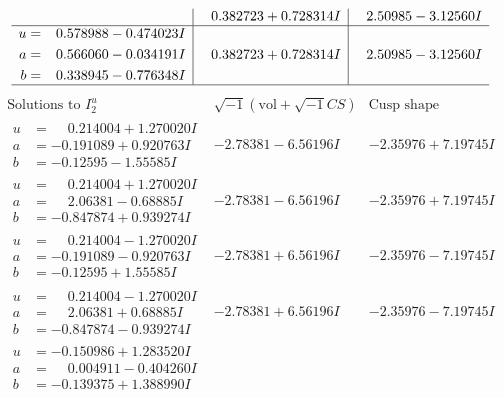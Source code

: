 \documentclass[1p]{elsarticle_modified}
\theoremstyle{definition}
\newcommand{\I}{\sqrt{-1}}
\begin{document}
$$\begin{array}{c|c|c}
 & \phantom{-}0.382723 + 0.728314 I & \phantom{-}2.50985 - 3.12560 I \\ \hline\begin{aligned}
u &= \phantom{-}0.578988 - 0.474023 I \\
a &= \phantom{-}0.566060 - 0.034191 I \\
b &= \phantom{-}0.338945 - 0.776348 I\end{aligned}
 & \phantom{-}0.382723 + 0.728314 I & \phantom{-}2.50985 - 3.12560 I\\
 \hline 
 \end{array}$$\newpage$$\begin{array}{c|c|c}  
\text{Solutions to }I^u_{2}& \I (\text{vol} + \sqrt{-1}CS) & \text{Cusp shape}\\
 \hline 
\begin{aligned}
u &= \phantom{-}0.214004 + 1.270020 I \\
a &= -0.191089 + 0.920763 I \\
b &= -0.12595 - 1.55585 I\end{aligned}
 & -2.78381 - 6.56196 I & -2.35976 + 7.19745 I \\ \hline\begin{aligned}
u &= \phantom{-}0.214004 + 1.270020 I \\
a &= \phantom{-}2.06381 - 0.68885 I \\
b &= -0.847874 + 0.939274 I\end{aligned}
 & -2.78381 - 6.56196 I & -2.35976 + 7.19745 I \\ \hline\begin{aligned}
u &= \phantom{-}0.214004 - 1.270020 I \\
a &= -0.191089 - 0.920763 I \\
b &= -0.12595 + 1.55585 I\end{aligned}
 & -2.78381 + 6.56196 I & -2.35976 - 7.19745 I \\ \hline\begin{aligned}
u &= \phantom{-}0.214004 - 1.270020 I \\
a &= \phantom{-}2.06381 + 0.68885 I \\
b &= -0.847874 - 0.939274 I\end{aligned}
 & -2.78381 + 6.56196 I & -2.35976 - 7.19745 I \\ \hline\begin{aligned}
u &= -0.150986 + 1.283520 I \\
a &= \phantom{-}0.004911 - 0.404260 I \\
b &= -0.139375 + 1.388990 I\end{aligned}

\end{array}$$
\end{document}
